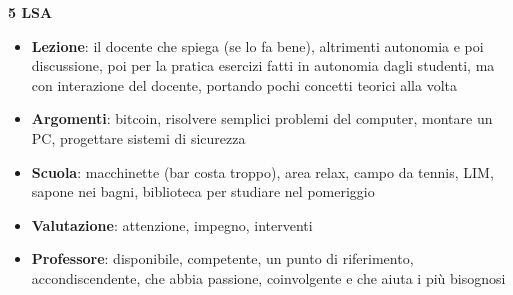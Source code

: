 \documentclass{article}
\begin{document}
	\begin{center}
	\textbf{5 LSA}
	\end{center}
	\begin{itemize}
	\item \textbf{Lezione}: il docente che spiega (se lo fa bene), altrimenti autonomia e poi discussione, poi per la pratica esercizi fatti in autonomia dagli studenti, ma con interazione del docente, portando pochi concetti teorici alla volta
	\item \textbf{Argomenti}: bitcoin, risolvere semplici problemi del computer, montare un PC, progettare sistemi di sicurezza
	\item \textbf{Scuola}: macchinette (bar costa troppo), area relax, campo da tennis, LIM, sapone nei bagni, biblioteca per studiare nel pomeriggio
	\item \textbf{Valutazione}: attenzione, impegno, interventi
	\item \textbf{Professore}: disponibile, competente, un punto di riferimento, accondiscendente, che abbia passione, coinvolgente e che aiuta i più bisognosi
	\end{itemize}
\end{document}
